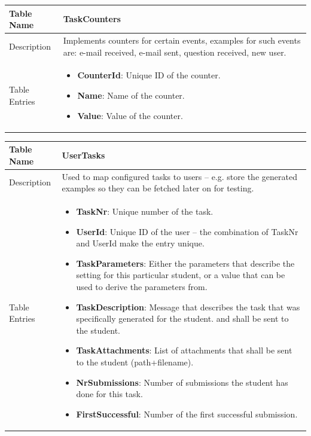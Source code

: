 \begin{tabular}{|p{3cm}|p{10cm}|}
\hline
Table Name & TaskCounters \\
\hline
Description & Implements counters for certain events, examples for such events are: e-mail received, e-mail sent, 
question received, new user.\\
\hline
Table Entries & \begin{itemize}
        \item {\bf CounterId}: Unique ID of the counter.
        \item {\bf Name}: Name of the counter.
        \item {\bf Value}: Value of the counter.
        \end{itemize} \\
\hline
\end{tabular}

\begin{tabular}{|p{3cm}|p{10cm}|}
\hline
Table Name & UserTasks \\
\hline
Description & Used to map configured tasks to users -- e.g. store the generated examples so they can be 
    fetched later on for testing.\\
\hline
Table Entries & \begin{itemize}
    \item {\bf TaskNr}: Unique number of the task.
    \item {\bf UserId}: Unique ID of the user -- the combination of TaskNr and UserId make the entry unique.
    \item {\bf TaskParameters}: Either the parameters that describe the setting for this particular student, or a value that can be
        used to derive the parameters from.
    \item {\bf TaskDescription}: Message that describes the task that was specifically generated for the student.
        and shall be sent to the student.
    \item {\bf TaskAttachments}: List of attachments that shall be sent to the student (path+filename).
    \item {\bf NrSubmissions}: Number of submissions the student has done for this task.
    \item {\bf FirstSuccessful}: Number of the first successful submission.
\end{itemize} \\
\hline
\end{tabular}



